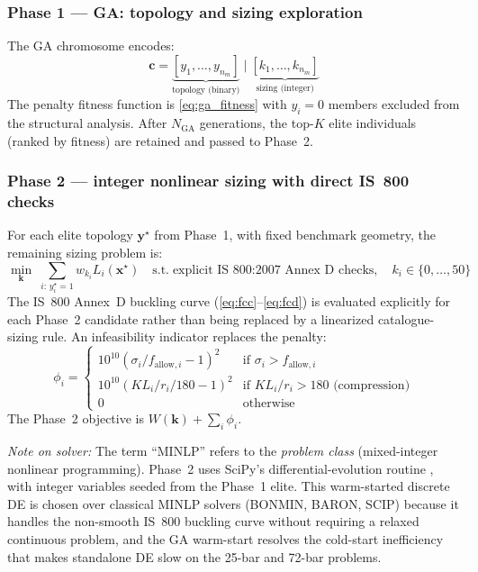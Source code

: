\documentclass[lineno,pdflatex,sn-mathphys-num]{sn-jnl}
\begin{document}
\subsubsection{Phase 1 --- GA: topology and sizing exploration}

The GA chromosome encodes:
\begin{equation}
  \mathbf{c} = \underbrace{[y_1,\ldots,y_{n_m}]}_{\text{topology (binary)}}
  \;\Big|\;
  \underbrace{[k_1,\ldots,k_{n_m}]}_{\text{sizing (integer)}}
  \label{eq:chromosome}
\end{equation}
The penalty fitness function is \cref{eq:ga_fitness} with $y_i=0$
members excluded from the structural analysis.
After $N_{\mathrm{GA}}$ generations, the top-$K$ elite individuals
(ranked by fitness) are retained and passed to Phase~2.

\subsubsection{Phase 2 --- integer nonlinear sizing with direct IS~800 checks}

For each elite topology $\mathbf{y}^\star$ from Phase~1, with fixed benchmark geometry, the remaining sizing problem is:
\begin{equation}
  \min_{\mathbf{k}}\;
  \sum_{i:\,y_i^\star=1} w_{k_i} L_i(\mathbf{x}^\star)
  \quad\text{s.t.}\;
  \text{explicit IS~800:2007 Annex~D checks},\quad
  k_i\in\{0,\ldots,50\}
  \label{eq:phase2}
\end{equation}
The IS~800 Annex~D buckling curve (\cref{eq:fcc}--\cref{eq:fcd}) is
evaluated explicitly for each Phase~2 candidate rather than being replaced by a
linearized catalogue-sizing rule.
An infeasibility indicator replaces the penalty:
\begin{equation}
  \phi_i =
  \begin{cases}
    10^{10}(\sigma_i/f_{\mathrm{allow},i}-1)^2 &
      \text{if }\sigma_i>f_{\mathrm{allow},i} \\
    10^{10}(KL_i/r_i/180-1)^2 &
      \text{if }KL_i/r_i>180\text{ (compression)} \\
    0 & \text{otherwise}
  \end{cases}
  \label{eq:infeas}
\end{equation}
The Phase~2 objective is $W(\mathbf{k})+\sum_i\phi_i$.

\textit{Note on solver:} The term ``MINLP'' refers to the \emph{problem
class} (mixed-integer nonlinear programming).
Phase~2 uses SciPy's differential-evolution routine
\citep{Virtanen2020}, with integer variables seeded from the Phase~1
elite.
This warm-started discrete DE is chosen over classical MINLP solvers
(BONMIN, BARON, SCIP) because it handles the non-smooth IS~800
buckling curve without requiring a relaxed continuous problem, and the
GA warm-start resolves the cold-start inefficiency that makes
standalone DE slow on the 25-bar and 72-bar problems.
\end{document}
